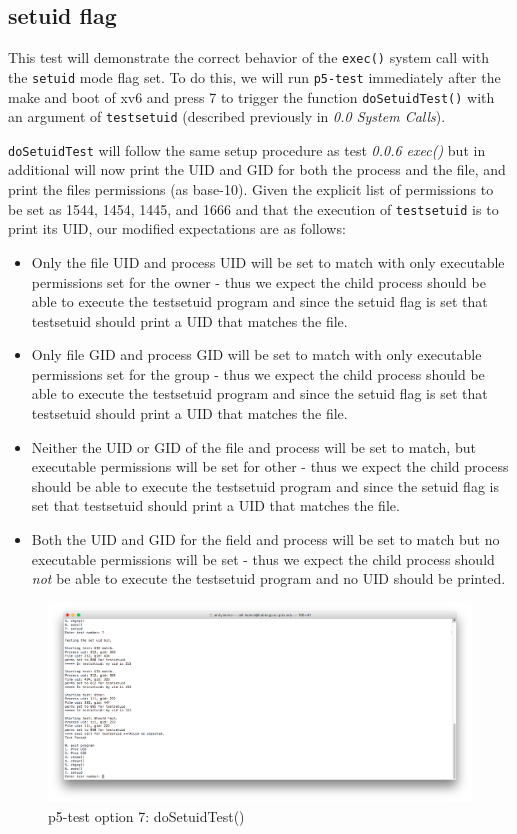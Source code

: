 \documentclass[11pt,letterpaper]{report}
\begin{document}
		
		\subsection{setuid flag}
		This test will demonstrate the correct behavior of the {\tt exec()} system call with the {\tt setuid} mode flag set. To do this, we will run {\tt p5-test} immediately after the make and boot of xv6 
	and press 7 to trigger the function {\tt doSetuidTest()} with an argument of {\tt testsetuid} (described previously in \emph{0.0 System Calls}).
		
		{\tt doSetuidTest} will follow the same setup procedure as test \emph{0.0.6 exec()} but in additional will now print the UID and GID for both the process and the file, 
		and print the files permissions (as base-10). Given the explicit list of permissions to be set as 1544, 1454, 1445, and 1666 and that
		the execution of {\tt testsetuid} is to print its UID, our modified expectations are as follows:
		
	\begin{itemize}
		\item Only the file UID and process UID will be set to match with only executable permissions set for the owner - thus we expect the child process should be able to execute the testsetuid program and since the setuid flag is set
			that testsetuid should print a UID that matches the file.
		\item Only file GID and process GID will be set to match with only executable permissions set for the group - thus we expect the child process should be able to execute the testsetuid program and since the setuid flag is set
			that testsetuid should print a UID that matches the file.
		\item Neither the UID or GID of the file and process will be set to match, but executable permissions will be set for other - thus we expect the child process should be able to execute 
		the testsetuid program and since the setuid flag is set
			that testsetuid should print a UID that matches the file.

		\item Both the UID and GID for the field and process will be set to match but no executable permissions will be set - thus we expect the child process should \emph{not} be able to execute the testsetuid program and no UID 
		should be printed.
	\end{itemize}

\begin{figure}[h!]
\centering
\includegraphics[width=0.8\linewidth]{dosetuidtest.png}
\caption{p5-test option 7: doSetuidTest()}
\label{fig:datetest}
\end{figure}	
\end{document}
